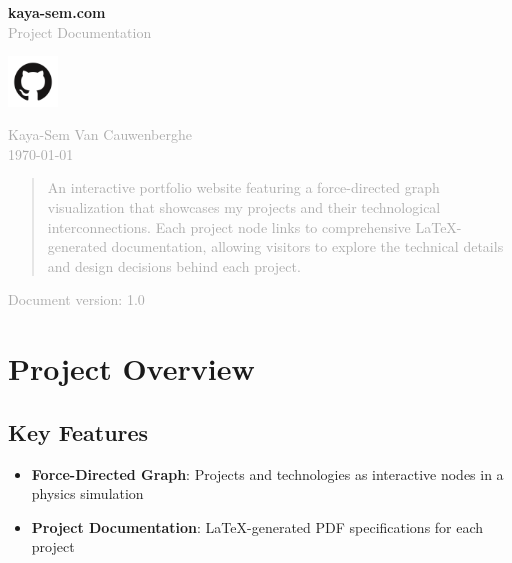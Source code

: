 \documentclass[10pt,a4paper]{article}
\newcommand{\projecttitle}[1]{
    \begin{center}
        {\Huge\bfseries\color{primary} #1}\\
        \vspace{0.5cm}
        \textcolor{darkgray}{\large Project Documentation}
    \end{center}
}
\begin{document}
\begin{titlepage}
	\centering
	\vspace*{2cm}

	\projecttitle{kaya-sem.com}

	\vspace{1cm}
	\begin{center}
		\href{https://github.com/Kaya-Sem/portfolio}{\includegraphics[width=0.1\textwidth]{../images/github-mark.png}}
	\end{center}

	\vspace{1cm}

	\textcolor{darkgray}{\large Kaya-Sem Van Cauwenberghe}\\
	\textcolor{darkgray}{\today}

	\vfill

	\begin{abstract}
		\noindent
		\textcolor{darkgray}{An interactive portfolio website featuring a force-directed graph visualization that showcases my projects and their technological interconnections. Each project node links to comprehensive LaTeX-generated documentation, allowing visitors to explore the technical details and design decisions behind each project.}
	\end{abstract}

	\vspace{1cm}

	\small
	\textcolor{darkgray}{Document version: 1.0}
\end{titlepage}

\newpage

\section{Project Overview}

\subsection{Key Features}
\begin{itemize}
	\item \textbf{Force-Directed Graph}: Projects and technologies as interactive nodes in a physics simulation
	\item \textbf{Project Documentation}: LaTeX-generated PDF specifications for each project
\end{itemize}
\end{document}
